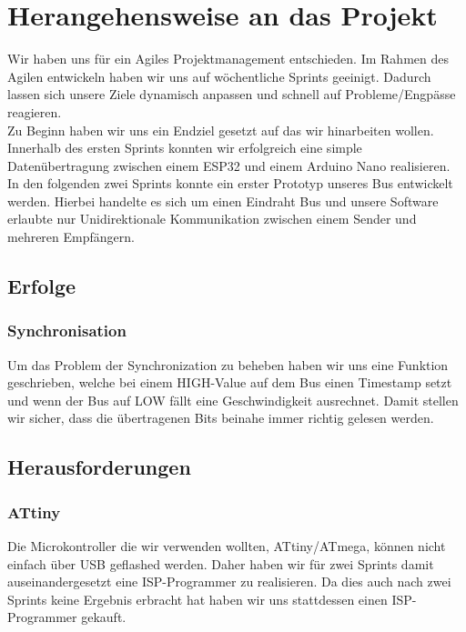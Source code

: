 \section{Herangehensweise an das Projekt}


Wir haben uns für ein Agiles Projektmanagement entschieden. Im Rahmen des Agilen entwickeln haben wir uns auf wöchentliche Sprints geeinigt. Dadurch lassen sich unsere Ziele dynamisch anpassen und schnell auf Probleme/Engpässe reagieren.\\

\noindent Zu Beginn haben wir uns ein Endziel gesetzt auf das wir hinarbeiten wollen. Innerhalb des ersten Sprints konnten wir erfolgreich eine simple Datenübertragung zwischen einem ESP32 und einem Arduino Nano realisieren. \\

\noindent In den folgenden zwei Sprints konnte ein erster Prototyp unseres Bus entwickelt werden. Hierbei handelte es sich um einen Eindraht Bus und unsere Software erlaubte nur Unidirektionale Kommunikation zwischen einem Sender und mehreren Empfängern.

\subsection{Erfolge}
\subsubsection{Synchronisation}
Um das Problem der Synchronization zu beheben haben wir uns eine Funktion geschrieben, welche bei einem HIGH-Value auf dem Bus einen Timestamp setzt und wenn der Bus auf LOW fällt eine Geschwindigkeit ausrechnet. Damit stellen wir sicher, dass die übertragenen Bits beinahe immer richtig gelesen werden.

\subsection{Herausforderungen}
\subsubsection{ATtiny}
Die Microkontroller die wir verwenden wollten, ATtiny/ATmega, können nicht einfach über USB geflashed werden. Daher haben wir für zwei Sprints damit auseinandergesetzt eine ISP-Programmer zu realisieren. Da dies auch nach zwei Sprints keine Ergebnis erbracht hat haben wir uns stattdessen einen ISP-Programmer gekauft.

